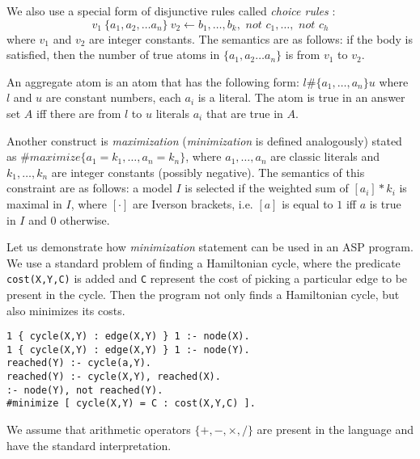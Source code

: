 We also use a special form of disjunctive rules called \textit{choice rules} \parencite{ASPbook}:
\begin{equation*}
  v_1~\{ a_1, a_2, \dots a_n \}~v_2 \leftarrow b_1, \dots, b_k, \textit{ not }c_1,\dots,\textit{ not }c_h
\end{equation*}
where $v_1$ and $v_2$ are integer constants. The semantics are as follows: if the body is satisfied, then the number of true atoms in $\{ a_1, a_2 \dots a_n \}$ is from $v_1$ to $v_2$.

An aggregate atom is an atom that has the following form: $l \# \{ a_1, \dots ,a_n \} u$
where $l$ and $u$ are constant numbers, each $a_i$ is a literal. The atom is true in an answer set $A$ iff there are from $l$ to $u$ literals $a_i$ that are true in $A$.

Another construct is \textit{maximization} \parencite{ASPbook, leone} (\textit{minimization} is defined analogously) stated as $\#\textit{maximize}\{ a_1=k_1, \dots, a_n=k_n \}$, 
where $a_1, \dots, a_n$ are classic literals and $k_1, \dots, k_n$ are integer constants (possibly negative). The semantics of this constraint are as follows: a model $I$ is selected if the weighted sum of $[a_i]*k_i$ is maximal in $I$, where $[\cdot]$ are Iverson brackets, i.e. $[a]$ is equal to $1$ iff $a$ is true in $I$ and $0$ otherwise.

\begin{example}
    Let us demonstrate how \textit{minimization} statement can be used in an ASP program. We use a standard problem of finding a Hamiltonian cycle, where the predicate \texttt{cost(X,Y,C)} is added and \texttt{C} represent the cost of picking a particular edge to be present in the cycle. Then the program not only finds a Hamiltonian cycle, but also minimizes its costs.
    \begin{lstlisting}[caption=ASP encoding of the Hamiltonian cycle problem (due to \textcite{ASPbook}), label=lst:example_asp_coloring,basicstyle=\ttfamily]
1 { cycle(X,Y) : edge(X,Y) } 1 :- node(X). 
1 { cycle(X,Y) : edge(X,Y) } 1 :- node(Y).
reached(Y) :- cycle(a,Y).
reached(Y) :- cycle(X,Y), reached(X).
:- node(Y), not reached(Y).
#minimize [ cycle(X,Y) = C : cost(X,Y,C) ].
\end{lstlisting}
\end{example}

We assume that arithmetic operators $\{ +, -, \times, / \}$ are present in the language and have the standard interpretation.

